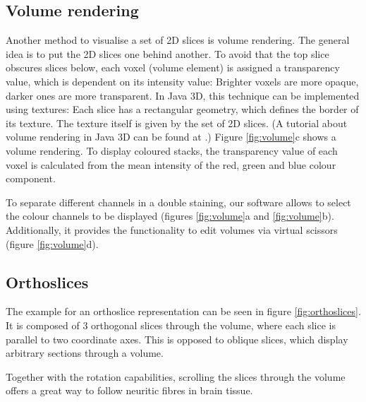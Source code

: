 \documentclass[a4paper,10pt]{article}
\begin{document}
\subsection{Volume rendering}
Another method to visualise a set of 2D slices is volume rendering.
The general idea is to put the 2D slices one behind another. To avoid that the top slice obscures slices below, each voxel (volume element) is assigned a transparency value, which is dependent on its intensity value: Brighter voxels are more opaque, darker ones are more transparent.
In Java 3D, this technique can be implemented using textures: Each slice has a rectangular geometry, which defines the border of its texture. The texture itself is given by the set of 2D slices. (A tutorial about volume rendering in Java 3D can be found at \cite{volrend}.)
Figure \ref{fig:volume}c shows a volume rendering. To display coloured stacks, the transparency value of each voxel is calculated from the mean intensity of the red, green and blue colour component.

To separate different channels in a double staining, our software allows to select the colour channels to be displayed (figures \ref{fig:volume}a and \ref{fig:volume}b). Additionally, it provides the functionality to edit volumes via virtual scissors (figure \ref{fig:volume}d).

\subsection{Orthoslices}
The example for an orthoslice representation can be seen in figure \ref{fig:orthoslices}. It is composed of 3 orthogonal slices through the volume, where each slice is parallel to two coordinate axes. This is opposed to oblique slices, which display arbitrary sections through a volume.

Together with the rotation capabilities, scrolling the slices through the volume offers a great way to follow neuritic fibres in brain tissue.
\end{document}
